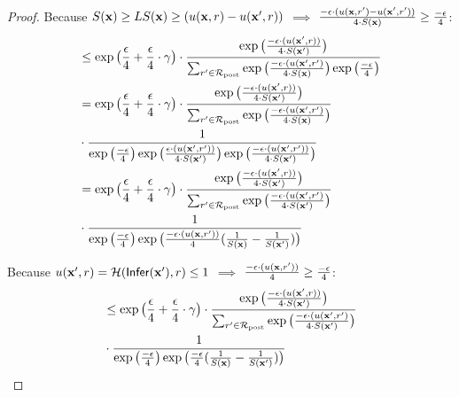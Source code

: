 \documentclass{article}
\begin{document}
\begin{proof}
  Because $S(\textbf{x}) \geq LS(\textbf{x}) \geq (u(\textbf{x}, {r}) - u(\textbf{x}', {r}))$ $\implies$ $ \frac{-\epsilon\cdot(u(\textbf{x}, {r'}) - u(\textbf{x}', {r'}))}{4 \cdot S(\textbf{x})} \geq \frac{-\epsilon}{4}$:
  \begin{equation*}
  \begin{split}
  & \leq \exp\big( \frac{\epsilon}{4} + \frac{\epsilon}{4} \cdot \gamma\big) \cdot 
  \frac {
  \exp
  \big(
  \frac{-\epsilon\cdot(u(\textbf{x}', {r}))}{4\cdot S(\textbf{x}')}
  \big)
  } 
  {
  \sum_{r'\in \mathcal{R}_{\textup{post}}} 
  \exp 
  \big(
  \frac{-\epsilon\cdot(u(\textbf{x}', {r'})}{4 \cdot S(\textbf{x})}
  \big)
  \exp 
  \big(
  \frac{-\epsilon}{4}
  \big)
  }\\
  & = \exp\big( \frac{\epsilon}{4} + \frac{\epsilon}{4} \cdot \gamma\big) \cdot 
  \frac {
  \exp
  \big(
  \frac{-\epsilon\cdot(u(\textbf{x}', {r}))}{4\cdot S(\textbf{x}')}
  \big)
  } 
  {
  \sum_{r'\in \mathcal{R}_{\textup{post}}} 
  \exp 
  \big(
  \frac{-\epsilon\cdot(u(\textbf{x}', {r'})}{4 \cdot S(\textbf{x})}
  \big)
  }\\
  & \cdot 
  \frac{1}
  {
  \exp 
  \big(
  \frac{-\epsilon}{4}
  \big)
  \exp
  \big(
  \frac{\epsilon\cdot(u(\textbf{x}', {r'}))}{4\cdot S(\textbf{x}')}
  \big)
  \exp
  \big(
  \frac{-\epsilon\cdot(u(\textbf{x}', {r'}))}{4\cdot S(\textbf{x}')}
  \big)
  }\\
  & = \exp\big( \frac{\epsilon}{4} + \frac{\epsilon}{4} \cdot \gamma\big) \cdot 
  \frac {
  \exp
  \big(
  \frac{-\epsilon\cdot(u(\textbf{x}', {r}))}{4\cdot S(\textbf{x}')}
  \big)
  } 
  {
  \sum_{r'\in \mathcal{R}_{\textup{post}}} 
  \exp 
  \big(
  \frac{-\epsilon\cdot(u(\textbf{x}', {r'})}{4 \cdot S(\textbf{x}')}
  \big)}\\
  & \cdot\frac{1}{
  \exp 
  \big(
  \frac{-\epsilon}{4}
  \big)
  \exp
  \big(
  \frac{- \epsilon\cdot(u(\textbf{x}, {r'}))}{4}
  (\frac{1}{S(\textbf{x})}
-
  \frac{1}{S(\textbf{x}')})
  \big)
  }
  \end{split}
  \end{equation*}

  Because $u(\textbf{x}', {r}) = \mathcal{H}(\mathsf{Infer}(\textbf{x}'), r) \leq 1$ $\implies$ $\frac{- \epsilon\cdot(u(\textbf{x}, {r'}))}{4} \geq  \frac{-\epsilon}{4}$:
  \begin{equation*}
  \begin{split}
  & \leq \exp\big( \frac{\epsilon}{4} + \frac{\epsilon}{4} \cdot \gamma\big) \cdot 
  \frac {
  \exp
  \big(
  \frac{-\epsilon\cdot(u(\textbf{x}', {r}))}{4\cdot S(\textbf{x}')}
  \big)
  } 
  {
  \sum_{r'\in \mathcal{R}_{\textup{post}}} 
  \exp 
  \big(
  \frac{-\epsilon\cdot(u(\textbf{x}', {r'})}{4 \cdot S(\textbf{x}')}
  \big)}\\
  & \cdot \frac{1}{
  \exp 
  \big(
  \frac{-\epsilon}{4}
  \big)
  \exp
  \big(
  \frac{- \epsilon}{4}
  (\frac{1}{S(\textbf{x})}
-
  \frac{1}{S(\textbf{x}')})
  \big)
  }\\
  \end{split}
  \end{equation*}


\end{proof}
\end{document}
